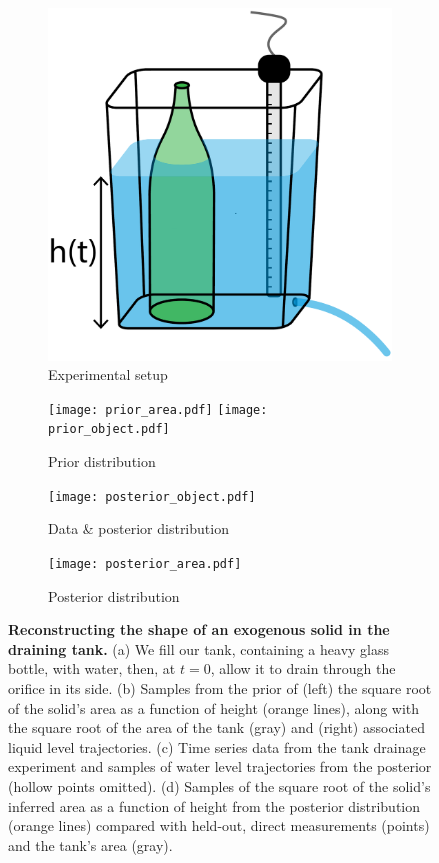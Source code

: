 \documentclass[a4paper,fleqn]{cas-dc}
\begin{document}
\begin{figure}[ht]
    \centering
        \begin{subfigure}[b]{0.2\textwidth}
    	\includegraphics[width=\textwidth]{tank_w_bottle.pdf}
	\caption{Experimental setup} \label{fig:tank_w_bottle}
    \end{subfigure}
     \begin{subfigure}[b]{0.8\textwidth}
    	\texttt{[image: prior\_area.pdf]}
	\texttt{[image: prior\_object.pdf]}
	\caption{Prior distribution} \label{fig:prior_area}
    \end{subfigure}
    
     \begin{subfigure}[b]{0.4\textwidth}
    	\texttt{[image: posterior\_object.pdf]}
	\caption{Data \& posterior distribution} \label{fig:posterior_object}
    \end{subfigure}
    \begin{subfigure}[b]{0.44\textwidth}
    	\texttt{[image: posterior\_area.pdf]}
	\caption{Posterior distribution} \label{fig:posterior_area}
    \end{subfigure}
    \caption{
      \textbf{Reconstructing the shape of an exogenous solid in the draining tank.} 
      (a) We fill our tank, containing a heavy glass bottle, with water, then, at $t=0$, allow it to drain through the orifice in its side.
      (b) Samples from the prior of (left) the square root of the solid's area as a function of height (orange lines), along with the square root of the area of the tank (gray) and (right) associated liquid level trajectories.
      (c) Time series data from the tank drainage experiment and samples of water level trajectories from the posterior (hollow points omitted).
      (d) Samples of the square root of the solid's inferred area as a function of height from the posterior distribution (orange lines) compared with held-out, direct measurements (points) and the tank's area (gray).
      }
\end{figure}
\end{document}
